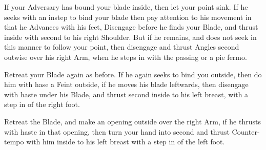 \newpage


\newpage


\exercise{}

If your Adversary has bound your blade inside, then let your point
sink. If he seeks with an instep to bind your blade then pay attention
to his movement in that he Advances with his feet, Disengage before he
finds your Blade, and thrust inside with second to his right
Shoulder. But if he remains, and does not seek in this manner to
follow your point, then disengage and thrust Angles second outwise
over his right Arm, when he steps in with the passing or a pie fermo.

\exercise{}


Retreat your Blade again as before. If he again seeks to bind you
outside, then do him with hase a Feint outside, if he moves his blade
leftwards, then disengage with haste under his Blade, and thrust
second inside to his left breast, with a step in of the right foot.

\exercise{}


Retreat the Blade, and make an opening outside over the right Arm, if
he thrusts with haste in that opening, then turn your hand into second
and thrust Counter-tempo with him inside to his left breast with a
step in of the left foot.

